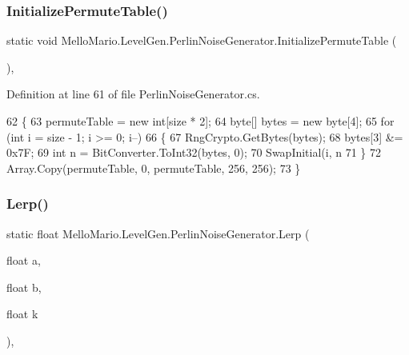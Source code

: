 \subsubsection{Initialize\+Permute\+Table()}
{\footnotesize\ttfamily static void Mello\+Mario.\+Level\+Gen.\+Perlin\+Noise\+Generator.\+Initialize\+Permute\+Table (\begin{DoxyParamCaption}{ }\end{DoxyParamCaption})\hspace{0.3cm}{\ttfamily [static]}, {\ttfamily [private]}}



Definition at line 61 of file Perlin\+Noise\+Generator.\+cs.


\begin{DoxyCode}
62         \{
63             permuteTable = \textcolor{keyword}{new} \textcolor{keywordtype}{int}[size * 2];
64             byte[] bytes = \textcolor{keyword}{new} byte[4];
65             \textcolor{keywordflow}{for} (\textcolor{keywordtype}{int} i = size - 1; i >= 0; i--)
66             \{
67                 RngCrypto.GetBytes(bytes);
68                 bytes[3] &= 0x7F;
69                 \textcolor{keywordtype}{int} n = BitConverter.ToInt32(bytes, 0);
70                 SwapInitial(i, n %
71             \}
72             Array.Copy(permuteTable, 0, permuteTable, 256, 256);
73         \}
\end{DoxyCode}
\mbox{\label{classMelloMario_1_1LevelGen_1_1PerlinNoiseGenerator_a81f0453558faab1f434f650feff66953}} 
\subsubsection{Lerp()}
{\footnotesize\ttfamily static float Mello\+Mario.\+Level\+Gen.\+Perlin\+Noise\+Generator.\+Lerp (\begin{DoxyParamCaption}\item[{float}]{a,  }\item[{float}]{b,  }\item[{float}]{k }\end{DoxyParamCaption})\hspace{0.3cm}{\ttfamily [static]}, {\ttfamily [private]}}



